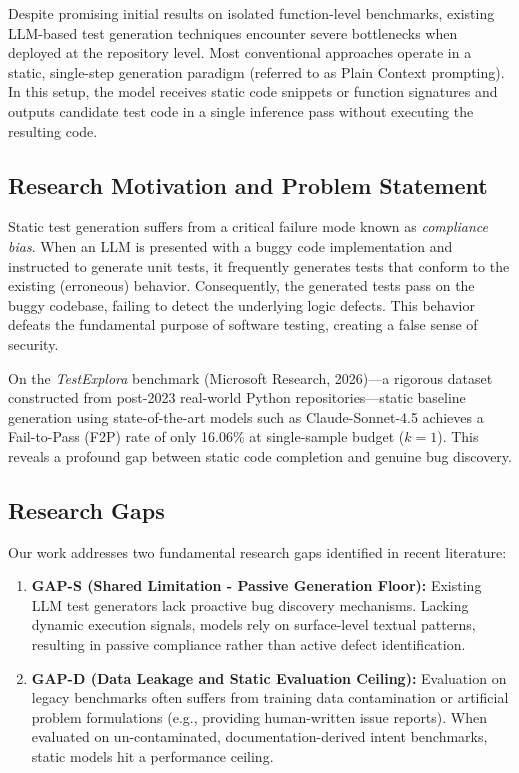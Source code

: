 \documentclass[conference]{IEEEtran}
\begin{document}
Despite promising initial results on isolated function-level benchmarks, existing LLM-based test generation techniques encounter severe bottlenecks when deployed at the repository level. Most conventional approaches operate in a static, single-step generation paradigm (referred to as Plain Context prompting). In this setup, the model receives static code snippets or function signatures and outputs candidate test code in a single inference pass without executing the resulting code.

\subsection{Research Motivation and Problem Statement}
Static test generation suffers from a critical failure mode known as \textit{compliance bias}. When an LLM is presented with a buggy code implementation and instructed to generate unit tests, it frequently generates tests that conform to the existing (erroneous) behavior. Consequently, the generated tests pass on the buggy codebase, failing to detect the underlying logic defects. This behavior defeats the fundamental purpose of software testing, creating a false sense of security.

On the \textit{TestExplora} benchmark (Microsoft Research, 2026)---a rigorous dataset constructed from post-2023 real-world Python repositories---static baseline generation using state-of-the-art models such as Claude-Sonnet-4.5 achieves a Fail-to-Pass (F2P) rate of only 16.06\% at single-sample budget ($k=1$). This reveals a profound gap between static code completion and genuine bug discovery.

\subsection{Research Gaps}
Our work addresses two fundamental research gaps identified in recent literature:
\begin{enumerate}
    \item \textbf{GAP-S (Shared Limitation - Passive Generation Floor):} Existing LLM test generators lack proactive bug discovery mechanisms. Lacking dynamic execution signals, models rely on surface-level textual patterns, resulting in passive compliance rather than active defect identification.
    \item \textbf{GAP-D (Data Leakage and Static Evaluation Ceiling):} Evaluation on legacy benchmarks often suffers from training data contamination or artificial problem formulations (e.g., providing human-written issue reports). When evaluated on un-contaminated, documentation-derived intent benchmarks, static models hit a performance ceiling.
\end{enumerate}
\end{document}

